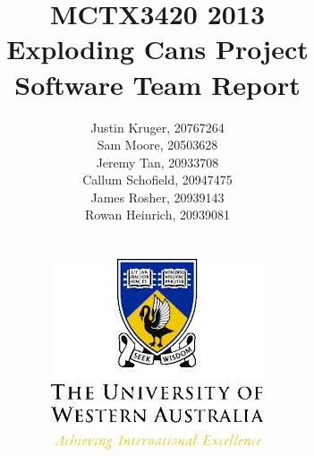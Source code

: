\begin{titlepage}
\title{MCTX3420 2013\\Exploding Cans Project\\Software Team Report}
\author{Justin Kruger, 20767264 \\
		Sam Moore, 20503628 \\
		Jeremy Tan, 20933708 \\
		Callum Schofield, 20947475 \\
		James Rosher, 20939143 \\
		Rowan Heinrich, 20939081 \\ \\ \\
		\includegraphics{figures/uwa_logo.jpeg}
}
\date{}
\maketitle
\centering
\end{titlepage}
